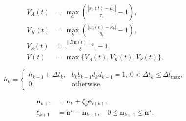 \begin{equation}
\begin{aligned}V_A(t)&=\max_a\left(\frac{|x_a(t)-\mu_a|}{\tau_a}-1\right),\\V_K(t)&=\max_b\left(\frac{|w_b(t)-\kappa_b|}{\eta_b}-1\right),\\V_S(t)&=\frac{\|B\mathbf u(t)\|_\infty}{\delta}-1,\\V(t)&=\max\{V_A(t),V_K(t),V_S(t)\}.\end{aligned}
\tag{10}
\end{equation}

\begin{equation}
h_k=\begin{cases}h_{k-1}+\Delta t_k,&b_kb_{k-1}d_kd_{k-1}=1,\ 0<\Delta t_k\leq\Delta t_{\max},\\0,&\text{otherwise}.\end{cases}
\tag{11}
\end{equation}

\begin{equation}
\begin{aligned}\mathbf n_{k+1}&=\mathbf n_k+\xi_k\mathbf e_{r(k)},\\\boldsymbol\ell_{k+1}&=\mathbf n^\star-\mathbf n_{k+1},\quad 0\leq\mathbf n_{k+1}\leq\mathbf n^\star.\end{aligned}
\tag{12}
\end{equation}